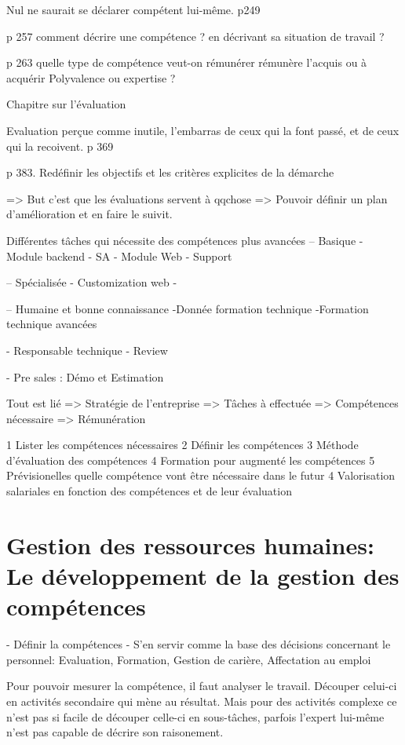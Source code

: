Nul ne saurait se déclarer compétent lui-même. p249

p 257 comment décrire une compétence ? en décrivant sa situation de travail ? 

p 263 quelle type de compétence veut-on rémunérer
rémunère l'acquis ou à acquérir
Polyvalence ou expertise ? 

Chapitre sur l'évaluation

Evaluation perçue comme inutile, l'embarras de ceux qui la font passé, et de ceux qui la recoivent. p 369

p 383. Redéfinir les objectifs et les critères explicites de la démarche

=> But c'est que les évaluations servent à qqchose
=> Pouvoir définir un plan d'amélioration et en faire le suivit.


Différentes tâches qui nécessite des compétences plus avancées
-- Basique
- Module backend
- SA
- Module Web
- Support

-- Spécialisée
- Customization web 
- 


-- Humaine et bonne connaissance
-Donnée formation technique
-Formation technique avancées

- Responsable technique
- Review

- Pre sales : Démo et Estimation


Tout est lié => Stratégie de l'entreprise => Tâches à effectuée => Compétences nécessaire => Rémunération


1 Lister les compétences nécessaires
2 Définir les compétences 
3 Méthode d'évaluation des compétences
4 Formation pour augmenté les compétences
5 Prévisionelles quelle compétence vont être nécessaire dans le futur
4 Valorisation salariales en fonction des compétences et de leur évaluation






\section{Gestion des ressources humaines: Le développement de la gestion des compétences}

- Définir la compétences
- S'en servir comme la base des décisions concernant le personnel: Evaluation, Formation, Gestion de carière, Affectation au emploi

Pour pouvoir mesurer la compétence, il faut analyser le travail. Découper celui-ci en activités secondaire qui mène au résultat.
Mais pour des activités complexe ce n'est pas si facile de découper celle-ci en sous-tâches, parfois l'expert lui-même n'est pas capable de décrire son raisonement.

